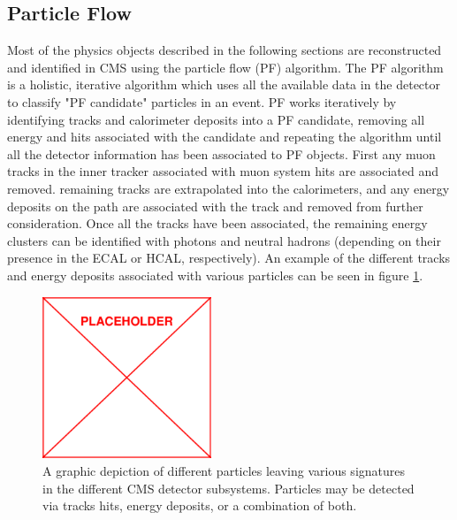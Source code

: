 \subsection{Particle Flow}
\label{subsec:pf}
Most of the physics objects described in the following sections are reconstructed and identified in CMS using the particle flow (PF) algorithm. The PF algorithm is a holistic, iterative algorithm which uses all the available data in the detector to classify "PF candidate" particles in an event. PF works iteratively by identifying tracks and calorimeter deposits into a PF candidate, removing all energy and hits associated with the candidate and repeating the algorithm until all the detector information has been associated to PF objects. First any muon tracks in the inner tracker associated with muon system hits are associated and removed. remaining tracks are extrapolated into the calorimeters, and any energy deposits on the path are associated with the track and removed from further consideration. Once all the tracks have been associated, the remaining energy clusters can be identified with photons and neutral hadrons (depending on their presence in the ECAL or HCAL, respectively). An example of the different tracks and energy deposits associated with various particles can be seen in figure \ref{fig:pfCandidates}.
\begin{figure}
	\centering
	\includegraphics[width=0.45\textwidth]{figs/placeholder}
	\caption{A graphic depiction of different particles leaving various signatures in the different CMS detector subsystems. Particles may be detected via tracks hits, energy deposits, or a combination of both.}
	\label{fig:pfCandidates}
\end{figure}

